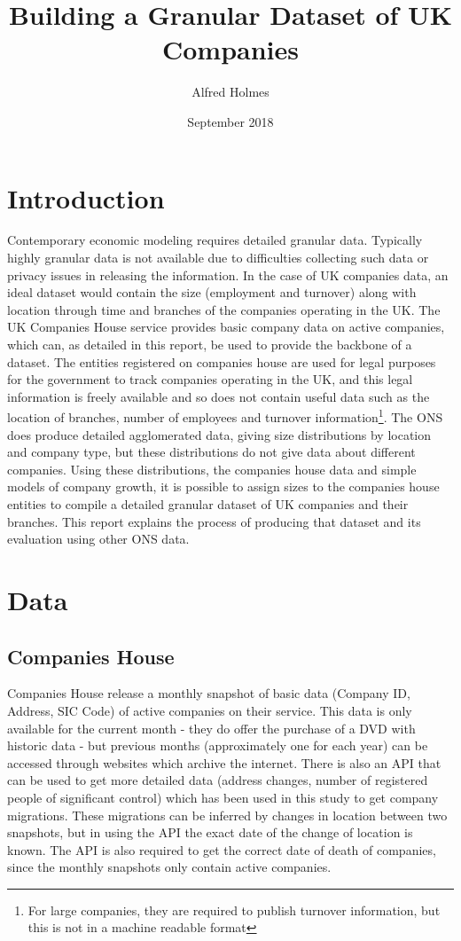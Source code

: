 \documentclass[a4paper,10pt]{article}
\title{Building a Granular Dataset of UK Companies}
\author{Alfred Holmes}
\date{September 2018}
\begin{document}
\maketitle
\section{Introduction}
Contemporary economic modeling requires detailed granular data. Typically highly granular data is not available due to difficulties collecting such data or privacy issues in releasing the information. In the case of UK companies data, an ideal dataset would contain the size (employment and turnover) along with location through time and branches of the companies operating in the UK. The UK Companies House service provides basic company data on active companies, which can, as detailed in this report, be used to provide the backbone of a dataset. The entities registered on companies house are used for legal purposes for the government to track companies operating in the UK, and this legal information is freely available and so does not contain useful data such as the location of branches, number of employees and turnover information\footnote{For large companies, they are required to publish turnover information, but this is not in a machine readable format}. The ONS does produce detailed agglomerated data, giving size distributions by location and company type, but these distributions do not give data about different companies. Using these distributions, the companies house data and simple models of company growth, it is possible to assign sizes to the companies house entities to compile a detailed granular dataset of UK companies and their branches. This report explains the process of producing that dataset and its evaluation using other ONS data.  

\section{Data}
\subsection{Companies House}
Companies House release a monthly snapshot of basic data (Company ID, Address, SIC Code) of active companies on their service. This data is only available for the current month - they do offer the purchase of a DVD with historic data - but previous months (approximately one for each year) can be accessed through websites which archive the internet. There is also an API that can be used to get more detailed data (address changes, number of registered people of significant control) which has been used in this study to get company migrations. These migrations can be inferred by changes in location between two snapshots, but in using the API the exact date of the change of location is known. The API is also required to get the correct date of death of companies, since the monthly snapshots only contain active companies.
\end{document}
